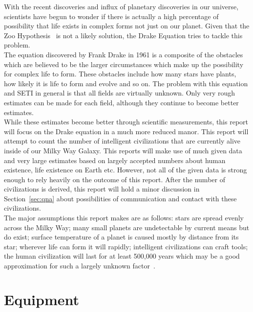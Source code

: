 \documentclass{article}
\begin{document}
With the recent discoveries and influx of planetary
discoveries in our universe, scientists have begun to wonder if there is actually a high percentage of possibility that life exists in complex
forms not just on our planet.  Given that the Zoo Hypothesis~\cite{Ball:1973} is not a likely solution, the Drake Equation tries to tackle this problem.\\

The equation discovered by Frank Drake in 1961 is a composite of the obstacles which are believed to be the larger circumstances which make
up the possibility for complex life to form. These obstacles include how many stars have plants, how likely it is life to form and evolve and so
on. The problem with this equation and SETI in general is that all fields are virtually unknown. Only very rough estimates can be made for
each field, although they continue to become better estimates.\\

While these estimates become better through scientific measurements, this report will focus on the Drake equation in a much more reduced
manor. This report will attempt to count the number of intelligent civilizations that are currently alive inside of our Milky Way Galaxy. This reports
will make use of much given data and very large estimates based on largely accepted numbers about human existence, life existence on Earth etc.
However, not all of the given data is strong enough to rely heavily on the outcome of this report. After the number of civilizations is derived, this
report will hold a minor discussion in Section~\ref{sec:qna} about possibilities of communication and contact with these civilizations.\\

The major assumptions this report makes are as follows: stars are spread evenly across the Milky Way; many small planets are undetectable
by current means but do exist; surface temperature of a planet is caused mostly by distance from its star; wherever life can form it will rapidly;
intelligent civilizations can craft tools; the human civilization will last for at least 500,000 years which may be a good approximation for such
a largely unknown factor~\cite{nova:2010}.


\section{Equipment}
\end{document}
